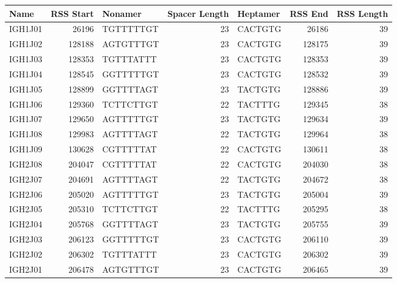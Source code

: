 \begin{tabular}{lrlrlrr}
  \toprule Name & RSS Start & Nonamer & Spacer Length & Heptamer & RSS End & RSS Length \\ 
  \midrule IGH1J01 & 26196 & TGTTTTTGT & 23 & CACTGTG & 26186 & 39 \\ 
  IGH1J02 & 128188 & AGTGTTTGT & 23 & CACTGTG & 128175 & 39 \\ 
  IGH1J03 & 128353 & TGTTTATTT & 23 & CACTGTG & 128353 & 39 \\ 
  IGH1J04 & 128545 & GGTTTTTGT & 23 & CACTGTG & 128532 & 39 \\ 
  IGH1J05 & 128899 & GGTTTTAGT & 23 & TACTGTG & 128886 & 39 \\ 
  IGH1J06 & 129360 & TCTTCTTGT & 22 & TACTTTG & 129345 & 38 \\ 
  IGH1J07 & 129650 & AGTTTTTGT & 23 & TACTGTG & 129634 & 39 \\ 
  IGH1J08 & 129983 & AGTTTTAGT & 22 & TACTGTG & 129964 & 38 \\ 
  IGH1J09 & 130628 & CGTTTTTAT & 22 & CACTGTG & 130611 & 38 \\ 
  IGH2J08 & 204047 & CGTTTTTAT & 22 & CACTGTG & 204030 & 38 \\ 
  IGH2J07 & 204691 & AGTTTTAGT & 22 & TACTGTG & 204672 & 38 \\ 
  IGH2J06 & 205020 & AGTTTTTGT & 23 & TACTGTG & 205004 & 39 \\ 
  IGH2J05 & 205310 & TCTTCTTGT & 22 & TACTTTG & 205295 & 38 \\ 
  IGH2J04 & 205768 & GGTTTTAGT & 23 & TACTGTG & 205755 & 39 \\ 
  IGH2J03 & 206123 & GGTTTTTGT & 23 & CACTGTG & 206110 & 39 \\ 
  IGH2J02 & 206302 & TGTTTATTT & 23 & CACTGTG & 206302 & 39 \\ 
  IGH2J01 & 206478 & AGTGTTTGT & 23 & CACTGTG & 206465 & 39 \\ 
   \bottomrule \end{tabular}
